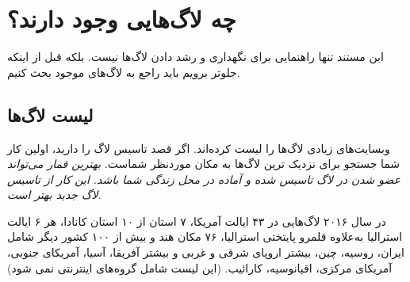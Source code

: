 \section{چه لاگ‌هایی وجود دارند؟}

این مستند تنها راهنمایی برای نگهداری و رشد دادن لاگ‌ها نیست.
بلکه قبل از اینکه جلوتر برویم باید راجع به لاگ‌های موجود بحث کنیم.

\subsection{لیست لاگ‌ها}

وبسایت‌های زیادی لاگ‌ها را لیست کرده‌اند. اگر قصد تاسیس لاگ را دارید،
اولین کار شما جستجو برای نزدیک ترین لاگ‌ها به مکان موردنظر شماست.
{\itshape
بهترین قمار می‌تواند عضو شدن در لاگ تاسیس شده و آماده در محل زندگی شما باشد.
این کار از تاسیس لاگ جدید بهتر است.
}

در سال ۲۰۱۶ لاگ‌هایی در ۴۳ ایالت آمریکا، ۷ استان از ۱۰ استان کانادا،
هر ۶ ایالت استرالیا به‌علاوه قلمرو پایتختی استرالیا، ۷۶ مکان هند و
بیش از ۱۰۰ کشور دیگر شامل ایران، روسیه، چین، بیشتر اروپای شرقی و غربی
و بیشتر آفریقا، آسیا، آمریکای جنوبی، آمریکای مرکزی، اقیانوسیه، کارائیب.
(این لیست شامل گروه‌های اینترنتی
نمی ‌شود)

